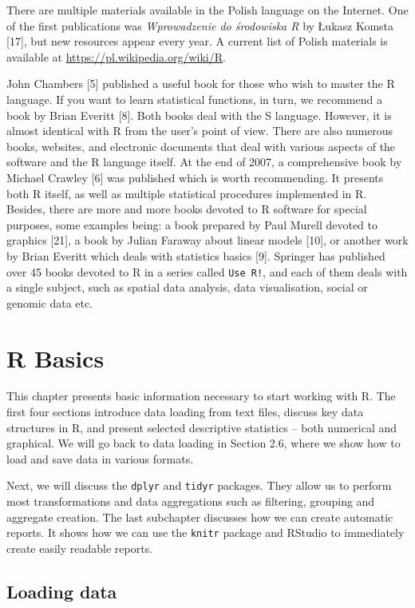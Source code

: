 \documentclass[]{book}
\theoremstyle{definition}
\theoremstyle{definition}
\theoremstyle{definition}
\theoremstyle{remark}
\begin{document}
There are multiple materials available in the Polish language on the
Internet. One of the first publications was \emph{Wprowadzenie do
środowiska R} by Łukasz Komsta {[}17{]}, but new resources appear every
year. A current list of Polish materials is available at
\url{https://pl.wikipedia.org/wiki/R}.

John Chambers {[}5{]} published a useful book for those who wish to
master the R language. If you want to learn statistical functions, in
turn, we recommend a book by Brian Everitt {[}8{]}. Both books deal with
the S language. However, it is almost identical with R from the user's
point of view. There are also numerous books, websites, and electronic
documents that deal with various aspects of the software and the R
language itself. At the end of 2007, a comprehensive book by Michael
Crawley {[}6{]} was published which is worth recommending. It presents
both R itself, as well as multiple statistical procedures implemented in
R. Besides, there are more and more books devoted to R software for
special purposes, some examples being: a book prepared by Paul Murell
devoted to graphics {[}21{]}, a book by Julian Faraway about linear
models {[}10{]}, or another work by Brian Everitt which deals with
statistics basics {[}9{]}. Springer has published over 45 books devoted
to R in a series called \texttt{Use\ R!}, and each of them deals with a
single subject, such as spatial data analysis, data visualisation,
social or genomic data etc.

\chapter{R Basics}\label{part_2}

This chapter presents basic information necessary to start working with
R. The first four sections introduce data loading from text files,
discuss key data structures in R, and present selected descriptive
statistics -- both numerical and graphical. We will go back to data
loading in Section 2.6, where we show how to load and save data in
various formats.

Next, we will discuss the \texttt{dplyr} and \texttt{tidyr} packages.
They allow us to perform most transformations and data aggregations such
as filtering, grouping and aggregate creation. The last subchapter
discusses how we can create automatic reports. It shows how we can use
the \texttt{knitr} package and RStudio to immediately create easily
readable reports.

\section{Loading data}\label{part_21}
\end{document}
